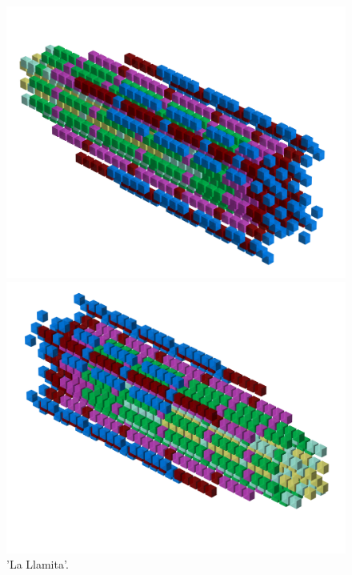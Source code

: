 \begin{figure}[H]
    \centering
    \begin{adjustbox}{width=12cm,center}
      \includegraphics[width=12cm]{src/patterns/pattern6-45.png}%
    \end{adjustbox}
    \begin{adjustbox}{width=12cm,margin=0cm -4cm}
      \includegraphics[width=12cm]{src/patterns/pattern6-225.png}%
    \end{adjustbox}
\caption{'La Llamita'.}
\end{figure}
\clearpage

